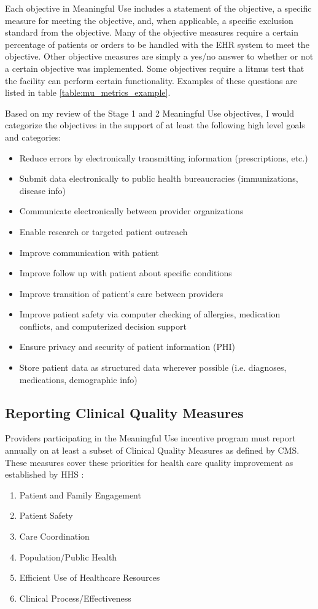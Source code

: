 \documentclass[10pt]{article}
\begin{document}
Each objective in Meaningful Use includes a statement of the objective, a specific measure for meeting the objective, and, when applicable, a specific exclusion standard from the objective.
Many of the objective measures require a certain percentage of patients or orders to be handled with the EHR system to meet the objective.
Other objective measures are simply a yes/no answer to whether or not a certain objective was implemented.
Some objectives require a litmus test that the facility can perform certain functionality. Examples of these questions are listed in table \ref{table:mu_metrics_example}.



Based on my review of the Stage 1 and 2 Meaningful Use objectives, I would categorize the objectives in the support of at least the following high level goals and categories:
\begin{itemize}
	\item Reduce errors by electronically transmitting information (prescriptions, etc.)
	\item Submit data electronically to public health bureaucracies (immunizations, disease info)
	\item Communicate electronically between provider organizations
	\item Enable research or targeted patient outreach
	\item Improve communication with patient
	\item Improve follow up with patient about specific conditions
	\item Improve transition of patient's care between providers
	\item Improve patient safety via computer checking of allergies, medication conflicts, and computerized decision support
	\item Ensure privacy and security of patient information (PHI)
	\item Store patient data as structured data wherever possible (i.e. diagnoses, medications, demographic info)
\end{itemize}

\subsection{Reporting Clinical Quality Measures}
\label{sec:CQM}

Providers participating in the Meaningful Use incentive program must report annually on at least a subset of Clinical Quality Measures as defined by CMS.
These measures cover these priorities for health care quality improvement as established by HHS \cite{cqm-intro}:
\begin{enumerate}
	\item Patient and Family Engagement
	\item Patient Safety
	\item Care Coordination
	\item Population/Public Health
	\item Efficient Use of Healthcare Resources
	\item Clinical Process/Effectiveness
\end{enumerate}
\end{document}
